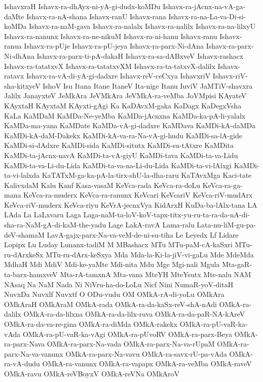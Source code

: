 {IshavxraH
Ishavx-ra-dhAyx-ni-yA-gi-dudx-koMDu
Ishavx-ra-jAcnx-na-vA-ga-daMte
Ishavx-ra-nA-shana
Ishavx-ranU
Ishavx-rana
Ishavx-ra-na-La-va-Di-si-koMDa
Ishavx-ra-naM-gava
Ishavx-ra-nalalx
Ishavx-ra-nalilx
Ishavx-ra-na-lilxyU
Ishavx-ra-nanunx
Ishavx-ra-ne-nikuM
Ishavx-ra-ni-hanu
Ishavx-ranu
Ishavx-ranua
Ishavx-ra-pUje
Ishavx-ra-pU-jeya
Ishavx-ra-parx-Ni-dAna
Ishavx-ra-parx-Ni-dhAna
Ishavx-ra-parx-ti-pA-dakaH
Ishavx-ra-sa-dABxveV
Ishavx-rashacx
Ishavx-ra-tatatxvX
Ishavx-ra-tatatxvXM
Ishavx-ra-ta-tatxvX-dalilx
Ishavx-ratavx
Ishavx-ra-vA-di-yA-gi-dadxre
Ishavx-reV-ceCxya
IshavxriV
Ishavx-riV-sha-kitxyeV
IshoV
Isu
Itana
Itane
ItaneV
Ita-nige
Itanu
IuviV
JaMTiV-shavxra
Jalilx
JanayxteV
JeMkAra
JeVMkAra
JeVMkA-ra-veMba
JoVMpisi
KAyateV
KAyxtaH
KAyxtaM
KAyxti-gAgi
Ka
KaDAvxM-gaka
KaDagx
KaDegxVsha
KaLa
KaMDaM
KaMDa-Ne-yeMba
KaMDa-jAcnxna
KaMDa-ka-pA-li-yalalx
KaMDa-ma-yana
KaMDate
KaMDa-vA-gi-dadxre
KaMDava
KaMDi-kA-daMDa
KaMDi-kA-daM-Dakekx
KaMDi-kA-va-ra-Na-vA-gi-hudu
KaMDi-sa-lA-gide
KaMDi-si-dAdxre
KaMDi-sida
KaMDi-situtx
KaMDi-su-tAtxre
KaMDita
KaMDi-ta-jAcnx-navA
KaMDi-ta-vA-giyU
KaMDi-tava
KaMDi-ta-va-Lidu
KaMDi-ta-va-Li-du-Lida
KaMDi-ta-va-na-Li-du-Lida
KaMDi-ta-vi-lAlxgi
KaMDi-ta-vi-lalxda
KaTATxM-ga-ka-pA-la-tirx-shU-la-dha-raru
KaTAvxMga
Kaci-tate
KalivxdaM
Kalu
Kanf
Kasa-vasaM
KeVca-rada
KeVca-ra-doLu
KeVca-ra-ga-mana
KeVca-ra-muderx
KeVca-ra-ranunx
KeVcari
KeVcariV
KeVca-riV-mudArx
KeVca-riV-muderx
KeVca-riyu
KeVrA-jecnxVya
KidArxH
KuDa-ba-lAlx-tana
LA
LAda
La
LaLxvaru
Laga
Laga-naM-ta-loV-koV-tapx-titx-yu-ru-ta-ra-da-nA-di-sha-ra-NaM-gA-di-kaM-the-yadu
Lage
LakA-ravA
Lama-ralu
Lata-nu-liM-gu-pa-deV-shamaM
LavA-gajx-parx-Na-va-veM-de-ni-su-tiha
Le
Leyedx
Lf
Lidare
Lopipx
Lu
Luday
Lunanx-tadiM
M
MBashacx
MTu
MTu-paM-cA-kaSxri
MTu-ru-dArxkeSx
MTu-ru-dArx-keSxya
Mda
Mda-la-Ki-la-jiV-vi-gaLu
Mde
MdeMda
MdhaH
Mdi
MdiV
Mdi-ke-yaMte
Mdi-nita
Mdu
Mge
Mgi-nali
Mgula
Mta-gaR-ta-barx-hamxveV
Mta-rA-tamxnA
Mta-vana
MteYH
MteYsutx
Mte-nalu
NAM
NAsaq
Na
NaM
Nada
Ni
NiVru-ha-do-LoLu
Nicf
Nini
NumaR-yoV-ditaH
NuvxDa
Nuvxlf
Nuvxtf
O
ODu-vudu
OM
OMkA-rA-di-yoLu
OMkAra
OMkAraH
OMkAraM
OMkA-rada
OMkA-ra-da-kaSx-reV-shA-nAdi
OMkA-ra-dalilx
OMkA-ra-da-lilxna
OMkA-ra-da-lilx-ruva
OMkA-ra-da-paR-NA-kAreV
OMkA-ra-da-va-re-gina
OMkA-ra-diMda
OMkA-rakekx
OMkA-ra-pU-vaR-ka-vAda
OMkA-ra-pU-vaR-ka-vAgi
OMkA-ra-pUvoRV
OMkA-ra-parx-Beya
OMkA-ra-parx-Nava
OMkA-ra-parx-Na-vada
OMkA-ra-parx-Na-va-rUpaM
OMkA-ra-parx-Na-va-vanunx
OMkA-ra-parx-Na-vavu
OMkA-ra-savx-rU-pa-vAda
OMkA-ra-vA-dudu
OMkA-ra-vanunx
OMkA-ra-vapapx
OMkA-ra-veMba
OMkA-raveV
OMkA-ravu
OMkA-reVBoyxV
OMkA-reVNa
OMkAroV
}
